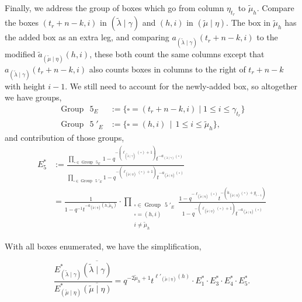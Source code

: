 \documentclass[ALCO]{cedram}
\newcommand{\Estar}[1]{E^*_{#1}}
\newcommand{\nudom}{{( \lambda \mid \gamma )}}
\newcommand{\lambdagamma}{{\nudom}}
\newcommand{\mutilde}{{\widetilde{\mu}}}
\newcommand{\lambdatilde}{{\widetilde{\lambda}}}
\newcommand{\lambdatildegamma}{{(\lambdatilde \mid \gamma)}}
\newcommand{\mutildeeta}{{(\mutilde \mid \eta)}}
\newcommand{\leg}[1]{{\ell_{#1}(\square)}}
\newcommand{\armone}[1]{{\widetilde{a}_{#1}(\square)}}
\newcommand{\armtwo}[1]{{a_{#1}(\square)}}
\newcommand{\group}[1]{\operatorname{Group}\,\operatorname{#1}}
\newcommand{\Estarone}{E^*_1}
\newcommand{\Estarthree}{E^*_3}
\newcommand{\Estarfour}{E^*_4}
\newcommand{\Estarfive}{E^*_5}
\begin{document}
Finally, we address the group of boxes which go from column $\eta_{t_r}$ to $\mutilde_h$. Compare the boxes $(t_r+n-k,i)$ in $\lambdatildegamma$ and $(h,i)$ in $\mutildeeta$. The box in $\mutilde_h$ has the added box as an extra leg, and comparing $a_\lambdatildegamma(t_r+n-k,i)$ to the modified $\widetilde{a}_\mutildeeta(h,i)$, these both count the same columns except that $a_\lambdatildegamma(t_r+n-k,i)$ also counts boxes in columns to the right of $t_r+n-k$ with height $i-1$. We still need to account for the newly-added box, so altogether we have groups,
\begin{align*} \group{5}_E &:= \{\square = (t_r+n-k,i) \mid  1 \leq i \leq \gamma_{t_r} \}\\
\group{5}'_E &:= \{ \square = (h,i) \, \mid \, 1 \leq i \leq \mutilde_h \},
\end{align*}
and contribution of those groups,
\begin{align*}
    \Estarfive &:= \frac{\prod\limits_{\square \in \group{5}_E} 1-q^{-(\leg{\lambdatildegamma}+1)}t^{-\armtwo{\lambdagamma}}}{\prod\limits_{\square \in \group{5}'_E} 1-q^{-(\leg{\mutildeeta}+1)}t^{-\armtwo{\mutildeeta}}}\\
    &= \frac{1}{1-q^{-1}t^{-a_\mutildeeta(h,\mutilde_h)}}\cdot \prod\limits_{\substack{\square \in \group{5}'_E \\ \square = (h,i) \\ i\neq \mutilde_h}} \frac{1-q^{-\leg{\mutildeeta}}t^{-(\armone{\mutildeeta}+g_{i-1})}}{1-q^{-(\leg{\mutildeeta}+1)}t^{-\armtwo{\mutildeeta}}}
\end{align*}

With all boxes enumerated, we have the simplification,

\[\frac{\Estar{\lambdatildegamma}\overline{\lambdatildegamma}}{\Estar{\mutildeeta}\overline{\mutildeeta}} = q^{-2\mutilde_h+1}t^{\ell'_{\mutildeeta}(h)} \cdot \Estarone \cdot \Estarthree \cdot \Estarfour \cdot \Estarfive.\]
\end{document}
